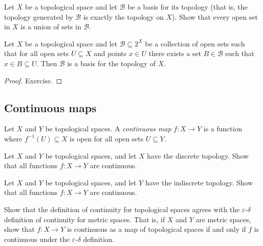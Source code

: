 \documentclass[a4paper,11pt]{article}
\begin{document}
    \begin{exercise}
      Let \(X\) be a topological space and let \(\mathcal{B}\) be a basis for its topology (that is, the topology generated by \(\mathcal{B}\) is exactly the topology on \(X\)). Show that every open set in \(X\) is a union of sets in \(\mathcal{B}\).
    \end{exercise}

    \begin{proposition}
      Let \(X\) be a topological space and let \(\mathcal{B} \subseteq 2^X\) be a collection of open sets such that for all open sets \(U \subseteq X\) and points \(x \in U\) there exists a set \(B \in \mathcal{B}\) such that \(x \in B \subseteq U\). Then \(\mathcal{B}\) is a basis for the topology of \(X\).
    \end{proposition}
    \begin{proof}
      Exercise.
    \end{proof}

    \subsection{Continuous maps}
    \begin{definition}
      Let \(X\) and \(Y\) be topological spaces. A \emph{continuous map} \(f: X \to Y\) is a function where \(f^{-1}(U) \subseteq X\) is open for all open sets \(U \subseteq Y\).
    \end{definition}

    \begin{exercise}
      Let \(X\) and \(Y\) be topological spaces, and let \(X\) have the discrete topology. Show that all functions \(f: X \to Y\) are continuous.
    \end{exercise}

    \begin{exercise}
      Let \(X\) and \(Y\) be topological spaces, and let \(Y\) have the indiscrete topology. Show that all functions \(f: X \to Y\) are continuous.
    \end{exercise}

    \begin{exercise}
      Show that the definition of continuity for topological spaces agrees with the \(\varepsilon\)-\(\delta\) definition of continuity for metric spaces. That is, if \(X\) and \(Y\) are metric spaces, show that \(f: X \to Y\) is continuous as a map of topological spaces if and only if \(f\) is continuous under the \(\varepsilon\)-\(\delta\) definition.
    \end{exercise}
\end{document}
